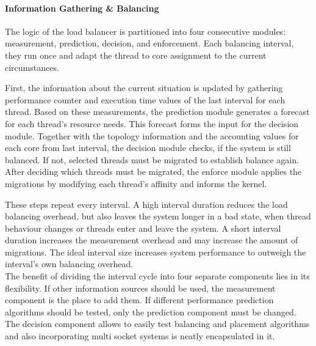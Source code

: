 \paragraph{Information Gathering \& Balancing}
The logic of the load balancer is partitioned into four consecutive modules:
measurement, prediction, decision, and enforcement.
Each balancing interval, they run once and adapt the thread to core
assignment to the current circumstances.

First, the information about the current situation is updated by gathering
performance counter and execution time values of the last interval for each
thread.
Based on these measurements, the prediction module generates a forecast for
each thread's resource needs.
This forecast forms the input for the decision module.
Together with the topology information and the accounting values for each core
from last interval, the decision module checks, if the system is still balanced.
If not, selected threads must be migrated to establish balance again.
After deciding which threads must be migrated, the enforce module applies the
migrations by modifying each thread's affinity and informs the kernel.

These steps repeat every interval. A high interval duration reduces the
load balancing overhead, but also leaves the system longer in a bad state, when
thread behaviour changes or threads enter and leave the system.
A short interval duration increases the measurement overhead and may increase
the amount of migrations.
The ideal interval size increases system performance to outweigh the interval's
own balancing overhead.
\\

The benefit of dividing the interval cycle into four separate components lies
in its flexibility.
If other information sources should be used, the measurement component is the
place to add them.
If different performance prediction algorithms should be tested, only the
prediction component must be changed.
The decision component allows to easily test balancing and placement algorithms
and also incorporating multi socket systems is neatly encapsulated in it.

